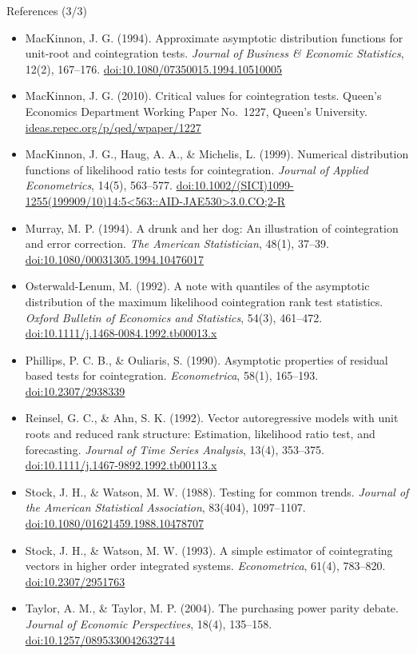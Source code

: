 \begin{frame}{References (3/3)}
\itemsize{\scriptsize}
\begin{itemize}
    \item MacKinnon, J. G. (1994). Approximate asymptotic distribution functions for unit-root and cointegration tests. \textit{Journal of Business \& Economic Statistics}, 12(2), 167--176. \href{https://doi.org/10.1080/07350015.1994.10510005}{doi:10.1080/07350015.1994.10510005}
    \item MacKinnon, J. G. (2010). Critical values for cointegration tests. Queen's Economics Department Working Paper No.~1227, Queen's University. \href{https://ideas.repec.org/p/qed/wpaper/1227.html}{ideas.repec.org/p/qed/wpaper/1227}
    \item MacKinnon, J. G., Haug, A. A., \& Michelis, L. (1999). Numerical distribution functions of likelihood ratio tests for cointegration. \textit{Journal of Applied Econometrics}, 14(5), 563--577. \href{https://doi.org/10.1002/(SICI)1099-1255(199909/10)14:5<563::AID-JAE530>3.0.CO;2-R}{doi:10.1002/(SICI)1099-1255(199909/10)14:5<563::AID-JAE530>3.0.CO;2-R}
    \item Murray, M. P. (1994). A drunk and her dog: An illustration of cointegration and error correction. \textit{The American Statistician}, 48(1), 37--39. \href{https://doi.org/10.1080/00031305.1994.10476017}{doi:10.1080/00031305.1994.10476017}
    \item Osterwald-Lenum, M. (1992). A note with quantiles of the asymptotic distribution of the maximum likelihood cointegration rank test statistics. \textit{Oxford Bulletin of Economics and Statistics}, 54(3), 461--472. \href{https://doi.org/10.1111/j.1468-0084.1992.tb00013.x}{doi:10.1111/j.1468-0084.1992.tb00013.x}
    \item Phillips, P. C. B., \& Ouliaris, S. (1990). Asymptotic properties of residual based tests for cointegration. \textit{Econometrica}, 58(1), 165--193. \href{https://doi.org/10.2307/2938339}{doi:10.2307/2938339}
    \item Reinsel, G. C., \& Ahn, S. K. (1992). Vector autoregressive models with unit roots and reduced rank structure: Estimation, likelihood ratio test, and forecasting. \textit{Journal of Time Series Analysis}, 13(4), 353--375. \href{https://doi.org/10.1111/j.1467-9892.1992.tb00113.x}{doi:10.1111/j.1467-9892.1992.tb00113.x}
    \item Stock, J. H., \& Watson, M. W. (1988). Testing for common trends. \textit{Journal of the American Statistical Association}, 83(404), 1097--1107. \href{https://doi.org/10.1080/01621459.1988.10478707}{doi:10.1080/01621459.1988.10478707}
    \item Stock, J. H., \& Watson, M. W. (1993). A simple estimator of cointegrating vectors in higher order integrated systems. \textit{Econometrica}, 61(4), 783--820. \href{https://doi.org/10.2307/2951763}{doi:10.2307/2951763}
    \item Taylor, A. M., \& Taylor, M. P. (2004). The purchasing power parity debate. \textit{Journal of Economic Perspectives}, 18(4), 135--158. \href{https://doi.org/10.1257/0895330042632744}{doi:10.1257/0895330042632744}
\end{itemize}
\end{frame}


